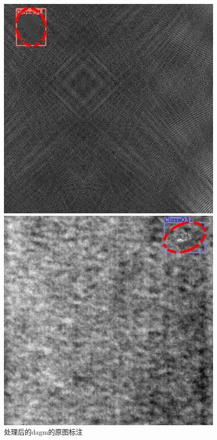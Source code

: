 \begin{figure}[!tbp]
    \centering
    \begin{minipage}[b]{0.4\textwidth}
      \includegraphics[width=\textwidth]{figures/33-0.jpg}
    \end{minipage}
    \hfill
    \begin{minipage}[b]{0.4\textwidth}
      \includegraphics[width=\textwidth]{figures/167-0.jpg}
    \end{minipage}
    \caption{处理后的dagm的原图标注}
    \vspace{-1em}
\end{figure}


